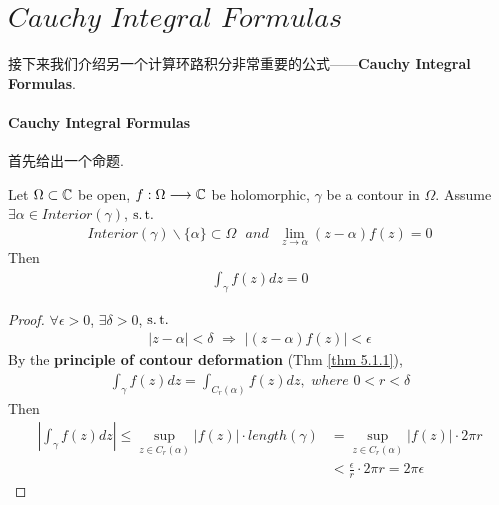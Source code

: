 \newpage
\section{$Cauchy \,\, Integral \,\, Formulas$}
	\begin{center}
		接下来我们介绍另一个计算环路积分非常重要的公式——\textbf{Cauchy Integral Formulas}.
	\end{center}

\paragraph{Cauchy Integral Formulas}
	首先给出一个命题.
	\begin{proposition}\label{prop 5.2.1}
		Let $\Omega \subset \mathbb{C}$ be open, $f : \Omega \longrightarrow \mathbb{C}$ be holomorphic, $\gamma$ be a contour in $\Omega$. Assume $\exists \alpha \in Interior(\gamma)$, $\operatorname{s.t.}$
		\begin{align}
			Interior(\gamma) \backslash \{ \alpha \} \subset \Omega \,\,\,\, and \,\,\,\, \lim_{z \to \alpha}{(z - \alpha)f(z)} = 0
		\end{align}
		Then
		\begin{align}
			\int_{\gamma}{f(z) dz} = 0
		\end{align}
	
		\vspace{2em}
		\begin{proof}
			$\forall \epsilon > 0$, $\exists \delta > 0$, $\operatorname{s.t.}$
			\begin{align}
				\left| z - \alpha \right| < \delta \,\, \Rightarrow \,\, \left| (z - \alpha) f(z) \right| < \epsilon
			\end{align}
			By the \textbf{principle of contour deformation} (Thm \ref{thm 5.1.1}),
			\begin{align}
				\int_{\gamma}{f(z) dz} = \int_{C_{r}(\alpha)}{f(z) dz} , \,\, where \,\, 0 < r < \delta
			\end{align}
			Then
			\begin{align}
				\left| \int_{\gamma}{f(z) dz} \right| 
				\leq \sup_{z \in C_{r}(\alpha)}{\left| f(z) \right|} \cdot length(\gamma) 
				&= \sup_{z \in C_{r}(\alpha)}{\left| f(z) \right|} \cdot 2 \pi r \\
				&< \frac{\epsilon}{r} \cdot 2 \pi r = 2 \pi \epsilon
			\end{align}
		\end{proof}
	\end{proposition}

